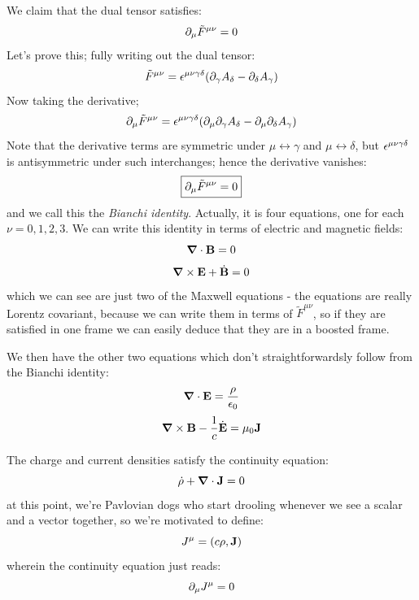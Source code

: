 We claim that the dual tensor satisfies:
\begin{equation}
    \partial_\mu \tilde{F}^{\mu\nu} = 0
\end{equation}
Let's prove this; fully writing out the dual tensor:
\begin{equation}
    \tilde{F}^{\mu\nu} = \epsilon^{\mu\nu\gamma\delta}(\partial_\gamma A_\delta - \partial_\delta A_\gamma)
\end{equation}
Now taking the derivative;
\begin{equation}
    \partial_\mu \tilde{F}^{\mu\nu} = \epsilon^{\mu\nu\gamma\delta}(\partial_\mu\partial_\gamma A_\delta - \partial_\mu \partial_\delta A_\gamma)
\end{equation}
Note that the derivative terms are symmetric under $\mu \leftrightarrow \gamma$ and $\mu \leftrightarrow \delta$, but $\epsilon^{\mu\nu\gamma\delta}$ is antisymmetric under such interchanges; hence the derivative vanishes:
\begin{equation}
    \boxed{\partial_\mu \tilde{F}^{\mu\nu} = 0}
\end{equation}
and we call this the \emph{Bianchi identity}. Actually, it is four equations, one for each $\nu = 0, 1, 2, 3$. We can write this identity in terms of electric and magnetic fields:
\begin{equation}
    \nabla \cdot \v{B} = 0
\end{equation}
\begin{equation}
    \nabla \times \v{E} + \dot{\v{B}} = 0
\end{equation}
which we can see are just two of the Maxwell equations - the equations are really Lorentz covariant, because we can write them in terms of $\tilde{F}^{\mu\nu}$, so if they are satisfied in one frame we can easily deduce that they are in a boosted frame.

We then have the other two equations which don't straightforwardsly follow from the Bianchi identity:
\begin{equation}
    \nabla \cdot \v{E} = \frac{\rho}{\e_0}
\end{equation}
\begin{equation}
    \nabla \times \v{B} - \frac{1}{c}\dot{\v{E}} = \mu_0\v{J}
\end{equation}

The charge and current densities satisfy the continuity equation:
\begin{equation}
    \dot{\rho} + \nabla \cdot \v{J} = 0
\end{equation}
at this point, we're Pavlovian dogs who start drooling whenever we see a scalar and a vector together, so we're motivated to define:
\begin{equation}
    J^\mu = (c\rho, \mathbf{J})
\end{equation}
wherein the continuity equation just reads:
\begin{equation}
    \partial_\mu J^\mu = 0 
\end{equation}

